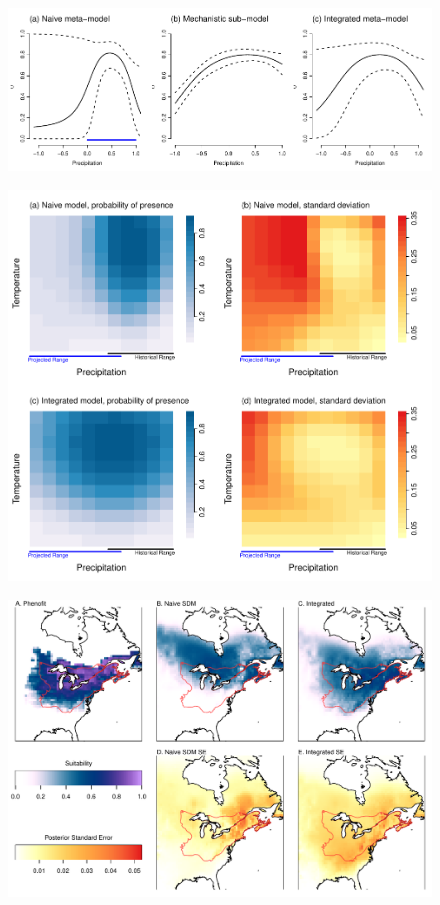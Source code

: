 \documentclass[11pt]{article}
\begin{document}
\newpage
\begin{figure}[h!]
	\includegraphics{ex1_precip.pdf}
	\caption{}
	\label{fig:ex1_precip}
\end{figure}


\newpage
\begin{figure}[h!]
	\includegraphics[width=5.25in]{ex1_map.pdf}
	\caption{}
	\label{fig:ex1_map}
\end{figure}


\newpage
\begin{figure}[h!]
	\includegraphics[width=6in]{ex2.pdf}
	\caption{}
	\label{fig:ex2}
\end{figure}
\end{document}
